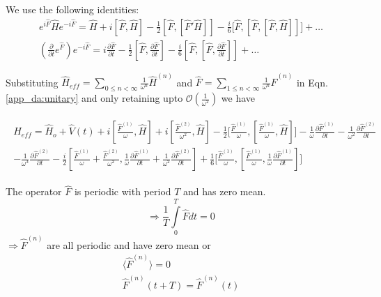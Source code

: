  We use the following identities: 
 \begin{gather}
  e^{i\hat{F}}\hat{H}e^{-i\hat{F}}= \hat{H} + i[\hat{F},\hat{H}] -\frac{1}{2}\left[\hat{F},[\hat{F}'\hat{H}]\right]-\frac{i}{6}\Biggl[\hat{F},\left[\hat{F},[\hat{F},\hat{H}]\right]\Biggr]+\dots \\
  \left(\frac{\partial}{\partial t}e^{\hat{F}}\right)e^{-i\hat{F}}= i\frac{\partial\hat{F}}{\partial t}-\frac{1}{2}[\hat{F},\frac{\partial\hat{F}}{\partial t}]-\frac{i}{6}\left[\hat{F},[\hat{F},\frac{\partial\hat{F}}{\partial t}]\right]+\dots
 \end{gather}
 
 Substituting $\hat{H}_{eff} =\displaystyle\sum_{0\leq n< \infty}\frac{1}{\omega^{n}}\hat{H}^{(n)}$ and 
 $\hat{F}= \displaystyle\sum_{1\leq n< \infty}\frac{1}{\omega^{n}}\hat{F}^{(n)}$ in Eqn. \eqref{app_da:unitary} and only retaining upto $\mathcal{O}\left(\frac{1}{\omega^2}\right)$
 we have
 
 \begin{eqnarray*}
 \begin{split}
  \hat{H}_{eff}= \hat{H}_{o}+ \hat{V}(t) +
  i\left[\frac{\hat{F}^{(1)}}{\omega},\hat{H}\right]+i\left[\frac{\hat{F}^{(2)}}{\omega^2},\hat{H}\right]   
  -\frac{1}{2}\Biggl[\frac{\hat{F}^{(1)}}{\omega},\left[\frac{\hat{F}^{(1)}}{\omega},\hat{H}\right]\Biggr]-\frac{1}{\omega}\frac{\partial\hat{F}^{(1)}}{\partial
    t} - \frac{1}{\omega^2}\frac{\partial\hat{F}^{(2)}}{\partial
    t}\\    -\frac{1}{\omega^3}\frac{\partial\hat{F}^{(2)}}{\partial t} 
  -\frac{i}{2}\left[\frac{\hat{F}^{(1)}}{\omega}+\frac{\hat{F}^{(2)}}{\omega^2},\frac{1}{\omega}\frac{\partial\hat{F}^{(1)}}{\partial
      t}+ \frac{1}{\omega^2}\frac{\partial\hat{F}^{(2)}}{\partial
      t}\right] +
  \frac{1}{6}\Biggl[\frac{\hat{F}^{(1)}}{\omega},\left[\frac{\hat{F}^{(1)}}{\omega},\frac{1}{\omega}\frac{\partial\hat{F}^{(1)}}{\partial
        t}\right]\Biggr]
 \end{split}
\end{eqnarray*}\par

The operator $\hat{F}$ is periodic with period $T$ and has zero mean.
\begin{equation*} 
  \Rightarrow\frac{1}{T}\int\limits_{0}^{T}\hat{F}dt=0
\end{equation*}
$\Rightarrow \hat{F}^{(n)}$ are all periodic and have zero mean or 
\begin{gather*}
  \langle \hat{F}^{(n)} \rangle=0 \\
  \hat{F}^{(n)}(t+T)=\hat{F}^{(n)}(t)
\end{gather*}

